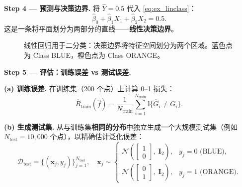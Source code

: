 \textbf{Step 4 --- 预测与决策边界.}
将 $\hat{Y} = 0.5$ 代入 \eqref{eq:ex_linclass}：
\[
\hat{\beta}_0 + \hat{\beta}_1 X_1 + \hat{\beta}_2 X_2 = 0.5.
\]
这是一条将平面划分为两部分的直线——\textbf{线性决策边界}。

\begin{figure}[htbp]
\centering
{}
\caption{线性回归用于二分类：决策边界将特征空间划分为两个区域。蓝色点为 Class BLUE，橙色点为 Class ORANGE。}
\label{fig:linear_classify}
\end{figure}

\textbf{Step 5 --- 评估：训练误差 vs 测试误差.}

\textbf{(a) 训练误差.}
在训练集（200 个点）上计算 0--1 损失：
\begin{equation}\label{eq:train_err}
    \widehat{R}_{\mathrm{train}}(\hat{f}) = \frac{1}{N_{\mathrm{train}}}\sum_{i=1}^{N_{\mathrm{train}}} \mathbb{I}\{ \hat{G}_i \neq G_i \}.
\end{equation}

\textbf{(b) 生成测试集.}
从与训练集\textbf{相同的分布}中独立生成一个大规模测试集（例如 $N_{\mathrm{test}} = 10{,}000$ 个点），以精确估计泛化误差：
\[
\mathcal{D}_{\mathrm{test}} = \{(\mathbf{x}_j, y_j)\}_{j=1}^{N_{\mathrm{test}}},
\quad \mathbf{x}_j \sim
\begin{cases}
\mathcal{N}\!\left(\begin{bmatrix} 1 \\ 0 \end{bmatrix},\; \mathbf{I}_2\right), & y_j = 0 \text{ (BLUE)}, \\[6pt]
\mathcal{N}\!\left(\begin{bmatrix} 0 \\ 1 \end{bmatrix},\; \mathbf{I}_2\right), & y_j = 1 \text{ (ORANGE)}.
\end{cases}
\]

